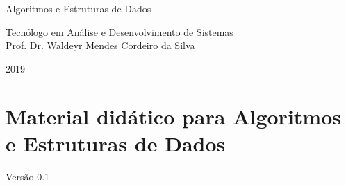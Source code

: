 \documentclass[11pt,fleqn]{book} %
\begin{document}
\let\cleardoublepage\clearpage

\renewcommand{\chaptername}{Capítulo}
\renewcommand{\figurename}{Fig.}

\begingroup
	\thispagestyle{empty}
	
	
	
	
	\vspace*{4.5cm}
	
	\centering
	\par
	\fontsize{30}{30}
	\selectfont
	Algoritmos e Estruturas de Dados \\
	\vspace*{1.5cm}
	\par
	\fontsize{16}{16}
	\selectfont
	Tecnólogo em Análise e Desenvolvimento de Sistemas\\
	\vspace*{1.5cm}
	Prof. Dr. Waldeyr Mendes Cordeiro da Silva\\
	\vspace*{10cm}
	\par
	{\Huge 2019}
	\par
\endgroup
\pagebreak

\par
\section*{Material didático para Algoritmos e Estruturas de Dados}

Versão 0.1
\end{document}
